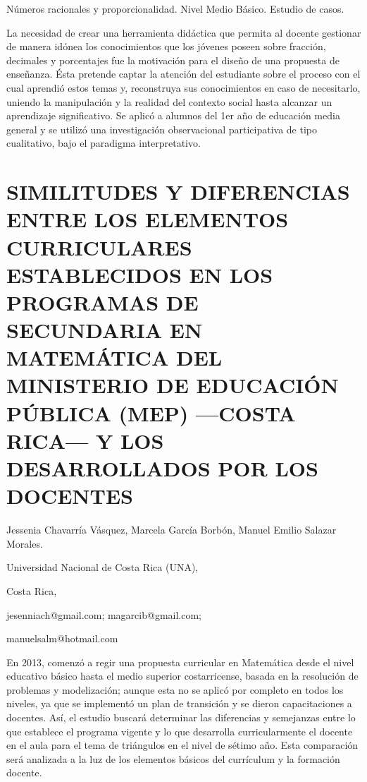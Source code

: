 Números racionales y proporcionalidad. Nivel Medio Básico. Estudio
de casos.

La necesidad de crear una herramienta didáctica que permita al docente
gestionar de manera idónea los conocimientos que los jóvenes poseen
sobre fracción, decimales y porcentajes fue la motivación para el
diseño de una propuesta de enseñanza. Ésta pretende captar la atención
del estudiante sobre el proceso con el cual aprendió estos temas y,
reconstruya sus conocimientos en caso de necesitarlo, uniendo la manipulación
y la realidad del contexto social hasta alcanzar un aprendizaje significativo.
Se aplicó a alumnos del 1er año de educación media general y se utilizó
una investigación observacional participativa de tipo cualitativo,
bajo el paradigma interpretativo. 

\renewcommand\thesection{\tiny CB\ \nplpadding{3}\numprint{\arabic{section}}\_{}A}

\setcounter{section}{151}


\section{ SIMILITUDES Y DIFERENCIAS ENTRE LOS ELEMENTOS CURRICULARES ESTABLECIDOS
EN LOS PROGRAMAS DE SECUNDARIA EN MATEMÁTICA DEL MINISTERIO DE EDUCACIÓN
PÚBLICA (MEP) —COSTA RICA— Y LOS DESARROLLADOS POR LOS DOCENTES}

\begin{datos}

Jessenia Chavarría Vásquez, Marcela García Borbón, Manuel Emilio Salazar
Morales.

Universidad Nacional de Costa Rica (UNA),

Costa Rica,

jesenniach@gmail.com; magarcib@gmail.com;

manuelsalm@hotmail.com

\end{datos}

En 2013, comenzó a regir una propuesta curricular en Matemática desde
el nivel educativo básico hasta el medio superior costarricense, basada
en la resolución de problemas y modelización; aunque esta no se aplicó
por completo en todos los niveles, ya que se implementó un plan de
transición y se dieron capacitaciones a docentes. Así, el estudio
buscará determinar las diferencias y semejanzas entre lo que establece
el programa vigente y lo que desarrolla curricularmente el docente
en el aula para el tema de triángulos en el nivel de sétimo año. Esta
comparación será analizada a la luz de los elementos básicos del currículum
y la formación docente.

